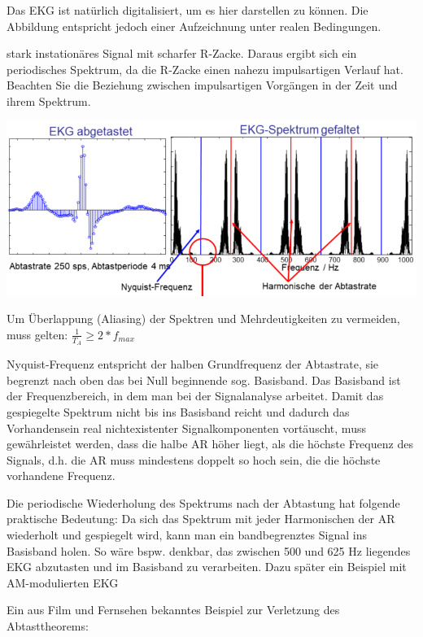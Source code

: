 \documentclass[a4paper]{article}
\begin{document}
\begin{multicols}{3}
  \begin{itemize*}
    \item Das EKG ist natürlich digitalisiert, um es hier darstellen zu können. Die Abbildung entspricht jedoch einer Aufzeichnung unter realen Bedingungen.
    \item stark instationäres Signal mit scharfer R-Zacke. Daraus ergibt sich ein periodisches Spektrum, da die R-Zacke einen nahezu impulsartigen Verlauf hat. Beachten Sie die Beziehung zwischen impulsartigen Vorgängen in der Zeit und ihrem Spektrum.
  \end{itemize*}

  \includegraphics[width=.5\linewidth]{Assets/Biosignalverarbeitung-EKG-tasten-falten.png}

  \begin{itemize*}
    \item Um Überlappung (Aliasing) der Spektren und Mehrdeutigkeiten zu vermeiden, muss gelten: $\frac{1}{T_A}\geq 2*f_{max}$
    \item Nyquist-Frequenz entspricht der halben Grundfrequenz der Abtastrate, sie begrenzt nach oben das bei Null beginnende sog. Basisband. Das Basisband ist der Frequenzbereich, in dem man bei der Signalanalyse arbeitet. Damit das gespiegelte Spektrum nicht bis ins Basisband reicht und dadurch das Vorhandensein real nichtexistenter Signalkomponenten vortäuscht, muss gewährleistet werden, dass die halbe AR höher liegt, als die höchste Frequenz des Signals, d.h. die AR muss mindestens doppelt so hoch sein, die die höchste vorhandene Frequenz.
    \item Die periodische Wiederholung des Spektrums nach der Abtastung hat folgende praktische Bedeutung: Da sich das Spektrum mit jeder Harmonischen der AR wiederholt und gespiegelt wird, kann man ein bandbegrenztes Signal ins Basisband holen. So wäre bspw. denkbar, das zwischen 500 und 625 Hz liegendes EKG abzutasten und im Basisband zu verarbeiten. Dazu später ein Beispiel mit AM-modulierten EKG
  \end{itemize*}

  Ein aus Film und Fernsehen bekanntes Beispiel zur Verletzung des
  Abtasttheorems:


\end{multicols}
\end{document}
